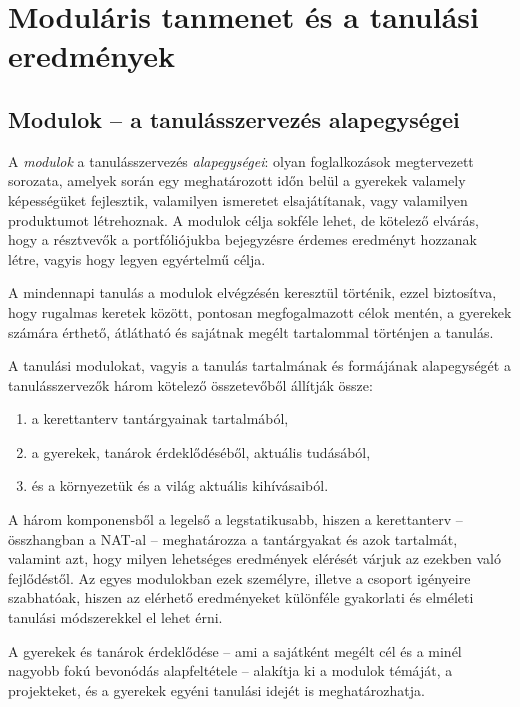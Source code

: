 \section{Moduláris tanmenet és a tanulási eredmények}

\subsection{Modulok -- a tanulásszervezés alapegységei}
\label{sec:modulok}

A \emph{modulok} a tanulásszervezés \emph{alapegységei}: olyan foglalkozások megtervezett sorozata, amelyek során egy meghatározott időn belül a gyerekek valamely képességüket fejlesztik, valamilyen ismeretet elsajátítanak, vagy valamilyen produktumot létrehoznak. A modulok célja sokféle lehet, de kötelező elvárás, hogy a résztvevők a portfóliójukba bejegyzésre érdemes eredményt hozzanak létre, vagyis hogy legyen egyértelmű célja.

A mindennapi tanulás a modulok elvégzésén keresztül történik, ezzel biztosítva, hogy rugalmas keretek között, pontosan megfogalmazott célok mentén, a gyerekek számára érthető, átlátható és sajátnak megélt tartalommal történjen a tanulás.

A tanulási modulokat, vagyis a tanulás tartalmának és formájának alapegységét a tanulásszervezők három kötelező összetevőből állítják össze:

\begin{enumerate}
      \item
            a kerettanterv tantárgyainak tartalmából,
      \item
            a gyerekek, tanárok érdeklődéséből, aktuális tudásából,
      \item
            és a környezetük és a világ aktuális kihívásaiból.
\end{enumerate}

A három komponensből a legelső a legstatikusabb, hiszen a kerettanterv -- összhangban a NAT-al -- meghatározza a tantárgyakat és azok tartalmát, valamint azt, hogy milyen lehetséges eredmények elérését várjuk az ezekben való fejlődéstől. Az egyes modulokban ezek személyre, illetve a csoport igényeire szabhatóak, hiszen az elérhető eredményeket különféle gyakorlati és elméleti tanulási módszerekkel el lehet érni.

A gyerekek és tanárok érdeklődése -- ami a sajátként megélt cél és a minél nagyobb fokú bevonódás alapfeltétele -- alakítja ki a modulok témáját, a projekteket, és a gyerekek egyéni tanulási idejét is meghatározhatja.

